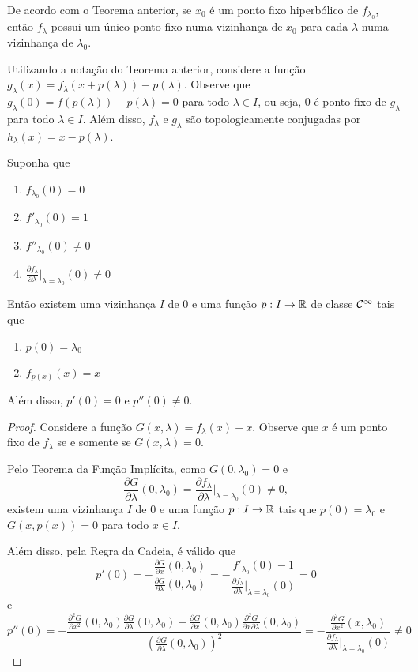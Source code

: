 De acordo com o Teorema anterior, se $x_0$ é um ponto fixo hiperbólico de $f_{\lambda_0}$, então $f_\lambda$ possui um único ponto fixo numa vizinhança de $x_0$ para cada $\lambda$ numa vizinhança de $\lambda_0$.
 
Utilizando a notação do Teorema anterior, considere a função $g_\lambda(x) = f_\lambda(x + p(\lambda)) - p(\lambda)$. Observe que $g_\lambda(0) = f(p(\lambda)) - p(\lambda) = 0$ para todo $\lambda \in I$, ou seja, $0$ é ponto fixo de $g_\lambda$ para todo $\lambda \in I$. Além disso, $f_\lambda$ e $g_\lambda$ são topologicamente conjugadas por $h_\lambda(x) = x - p(\lambda)$.

\begin{theorem}
Suponha que
\begin{enumerate}
\item $f_{\lambda_0}(0) = 0$
\item $f'_{\lambda_0}(0) = 1$
\item $f''_{\lambda_0}(0) \neq 0$
\item $\frac{\partial f_\lambda}{\partial \lambda} |_{\lambda = \lambda_0}(0) \neq 0$
\end{enumerate}
Então existem uma vizinhança $I$ de $0$ e uma função $p: I \to \mathbb{R}$ de classe $\mathcal{C}^\infty$ tais que
\begin{enumerate}
\item $p(0) = \lambda_0$
\item $f_{p(x)}(x) = x$
\end{enumerate}
Além disso, $p'(0) = 0$ e $p''(0) \neq 0$.
\end{theorem}

\begin{proof}
Considere a função $G(x, \lambda) = f_\lambda(x) - x$. Observe que $x$ é um ponto fixo de $f_\lambda$ se e somente se $G(x, \lambda) = 0$.

Pelo Teorema da Função Implícita, como $G(0, \lambda_0) = 0$ e 
$$\frac{\partial G}{\partial \lambda}(0, \lambda_0) = \frac{\partial f_\lambda}{\partial \lambda}|_{\lambda = \lambda_0}(0) \neq 0,$$
existem uma vizinhança $I$ de $0$ e uma função $p: I \to \mathbb{R}$ tais que $p(0) = \lambda_0$ e $G(x, p(x)) = 0$ para todo $x \in I$.

Além disso, pela Regra da Cadeia, é válido que
$$p'(0) = - \frac{\frac{\partial G}{\partial x}(0, \lambda_0)}
{\frac{\partial G}{\partial \lambda}(0, \lambda_0)} = - \frac{f'_{\lambda_0}(0) - 1}{\frac{\partial f_\lambda}{\partial \lambda}|_{\lambda = \lambda_0}(0)} = 0$$
e
$$ p''(0) = - \frac{\frac{\partial^2 G}{\partial x^2}(0, \lambda_0)\frac{\partial G}{\partial \lambda}(0, \lambda_0) - \frac{\partial G}{\partial x}(0, \lambda_0) \frac{\partial^2 G}{ \partial x \partial \lambda}(0, \lambda_0)}
{\left( \frac{\partial G}{\partial \lambda}(0, \lambda_0) \right)^2}  = - \frac{\frac{\partial^2 G}{\partial x^2}(x, \lambda_0)}{ \frac{\partial f_\lambda}{\partial \lambda}|_{\lambda = \lambda_0}(0)} \neq 0 $$
\end{proof}

